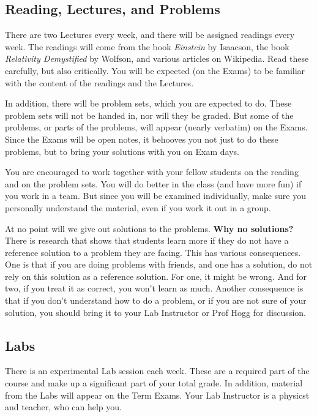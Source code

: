 \documentclass[12pt, letterpaper]{article}
\begin{document}
\subsection*{Reading, Lectures, and Problems}

There are two Lectures every week, and there
will be assigned readings every week.
The readings will come from the book \textit{Einstein} by Isaacson,
the book \textit{Relativity Demystified} by Wolfson,
and various articles on Wikipedia.
Read these carefully, but also critically.
You will be expected (on the Exams) to be familiar with the content of
the readings and the Lectures.

In addition, there will be problem sets, which you are
expected to do.
These problem sets will not be handed in, nor will they be graded.
But some of the problems, or parts of the problems, will appear
(nearly verbatim) on the Exams.
Since the Exams will be open notes, it behooves you not just to do
these problems, but to bring your solutions with you on Exam days.

You are encouraged to work together with your fellow students on the
reading and on the problem sets.
You will do better in the class (and have more fun) if you work in a
team.
But since you will be examined individually, make sure you personally
understand the material, even if you work it out in a group.

At no point will we give out solutions to the problems. \textbf{Why no
  solutions?} There is research that shows that students learn more if
they do not have a reference solution to a problem they are
facing. This has various consequences. One is that if you are doing
problems with friends, and one has a solution, do not rely on this
solution as a reference solution. For one, it might be wrong. And for
two, if you treat it as correct, you won't learn as much. Another
consequence is that if you don't understand how to do a problem, or if
you are not sure of your solution, you should bring it to your Lab
Instructor or Prof Hogg for discussion.

\subsection*{Labs}

There is an experimental Lab session each week. These are a required
part of the course and make up a significant part of your total grade.
In addition, material from the Labs will appear on the Term Exams.
Your Lab Instructor is a physicst and teacher, who can help you.
\end{document}

